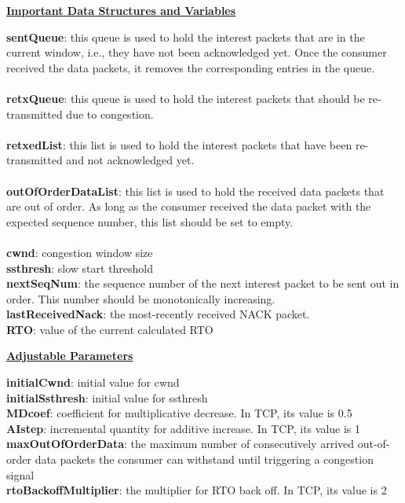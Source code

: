 \documentclass[10pt]{article}
\begin{document}
\vspace{1em}
\underline{\textbf{Important Data Structures and Variables}}\\
\begin{mdframed}
  \textbf{sentQueue}: this queue is used to hold the interest packets that are in
  the current window, i.e., they have not been acknowledged yet. Once
  the consumer received the data packets, it removes the
  corresponding entries in the queue.\\\\
  \textbf{retxQueue}: this queue is used to hold the interest packets that
  should be re-transmitted due to congestion.\\\\
  \textbf{retxedList}: this list is used to hold the interest packets
  that have been re-transmitted and not acknowledged yet.\\\\
  \textbf{outOfOrderDataList}: this list is used to hold the
  received data packets that are out of order. As long as the consumer
  received the data packet with the expected sequence number, this
  list should be set to empty.\\\\
  \textbf{cwnd}: congestion window size\\
  \textbf{ssthresh}: slow start threshold\\
  \textbf{nextSeqNum}: the sequence number of the next interest packet
  to be sent out in order. This number should be monotonically
  increasing.\\
  \textbf{lastReceivedNack}: the most-recently received NACK packet.\\
  \textbf{RTO}: value of the current calculated RTO
\end{mdframed}

\vspace{1em}
\underline{\textbf{Adjustable Parameters}}\\
\begin{mdframed}
  \textbf{initialCwnd}: initial value for cwnd\\
  \textbf{initialSsthresh}: initial value for ssthresh\\
  \textbf{MDcoef}: coefficient for multiplicative decrease. In TCP,
  its value is 0.5\\
  \textbf{AIstep}: incremental quantity for additive increase. In TCP,
  its value is 1\\
  \textbf{maxOutOfOrderData}: the maximum number of consecutively
  arrived out-of-order data packets the consumer can withstand until
  triggering a congestion signal\\
  \textbf{rtoBackoffMultiplier}: the multiplier for RTO back off. In
  TCP, its value is 2\\
\end{mdframed}
\end{document}
